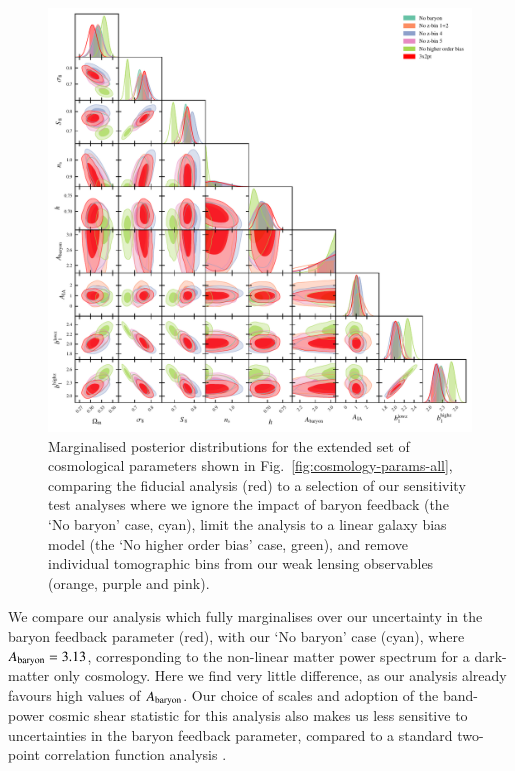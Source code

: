 \begin{appendix}
\begin{figure}
	\begin{center}
		\includegraphics[width=\textwidth]{Parameter_Plots/systematics/blind_C_EE_nE_w_systematics_chains}
		\caption{Marginalised posterior distributions for the extended set of cosmological parameters shown in Fig.~\ref{fig:cosmology-params-all}, comparing the fiducial \tttp analysis (red) to a selection of our sensitivity test analyses where we ignore the impact of baryon feedback (the `No baryon' case, cyan), limit the analysis to a linear galaxy bias model (the `No higher order bias' case, green), and remove individual tomographic bins from our weak lensing observables (orange, purple and pink).  }
		\label{fig:sensitivity_tests}
	\end{center}
\end{figure}

We compare our analysis which fully marginalises over our uncertainty in the baryon feedback parameter (red), with our `No baryon' case (cyan), where $A_{\rm baryon}=3.13$, corresponding to the non-linear matter power spectrum for a dark-matter only cosmology.   
Here we find very little difference, as our \tttp analysis already favours high values of $A_{\rm baryon}$.   
Our choice of scales and adoption of the band-power cosmic shear statistic for this analysis also makes us less sensitive to uncertainties in the baryon feedback parameter, compared to a standard two-point correlation function analysis \citep{asgari/etal:2020_KD}.


\end{appendix}
